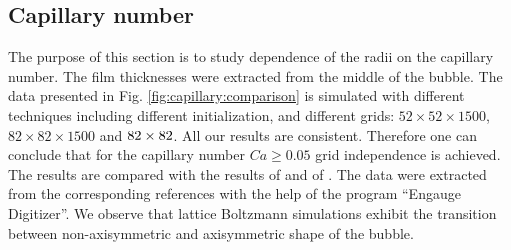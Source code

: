 \documentclass[preprint,12pt]{elsarticle}
\begin{document}
\subsection{Capillary number}
The purpose of this section is to study dependence of the radii on the capillary number. The film
thicknesses were extracted from the middle of the bubble. The data presented in Fig.
\ref{fig:capillary:comparison} is simulated with different techniques including different
initialization, and different grids: $52 \times 52 \times 1500$, $82 \times 82 \times 1500$ and $82
\times 82 \time 2400$. All our results are consistent. Therefore one can conclude that for the
capillary number $Ca\geq
0.05$ grid independence is achieved. The results are compared with the results of
\citet{heil-threedim} and of \citet{wang-non-circular}. The data were extracted from the
corresponding references with the help of the program ``Engauge Digitizer''. We observe that
lattice Boltzmann simulations exhibit 
the transition between non-axisymmetric and axisymmetric shape of the bubble. 
\end{document}
